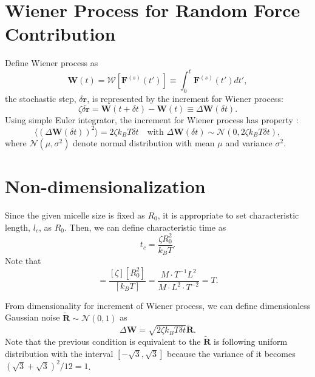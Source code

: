 \documentclass[10pt, a4paper]{report}
\begin{document}
\section{Wiener Process for Random Force Contribution}

Define Wiener process as
\begin{equation}
\mathbf{W}(t) = \mathscr{W}\left[\mathbf{F}^{(s)}(t')\right] \equiv \int_0^{t} \mathbf{F}^{(s)}(t')dt',
\end{equation}
the stochastic step, $\delta \mathbf{r}$, is represented by the increment for Wiener process:
\begin{equation}
\zeta \delta \mathbf{r} = \mathbf{W}(t+\delta t) - \mathbf{W}(t) \equiv \Delta \mathbf{W}(\delta t).
\end{equation}
Using simple Euler integrator, the increment for Wiener process has property \parencite{GREINER:1988cq}:
\begin{equation}
\langle (\Delta\mathbf{W}(\delta t))^2 \rangle = 2\zeta k_BT \delta t\quad\textrm{with }\Delta \mathbf{W}(\delta t) \sim \mathscr{N}(0, 2\zeta k_BT\delta t),\label{eq:increment_Wiener_process}
\end{equation}
where $\mathscr{N}(\mu, \sigma^2)$ denote normal distribution with mean $\mu$ and variance $\sigma^2$.


\section{Non-dimensionalization}
Since the given micelle size is fixed as $R_0$, it is appropriate to set characteristic length, $l_c$, as $R_0$. Then, we can define characteristic time as
\begin{equation}
t_c = \frac{\zeta R_0^2}{k_BT}.\label{eq:characteristic_time}
\end{equation}
Note that
\begin{equation}
[t_c] = \frac{[\zeta][R_0^2]}{[k_BT]} = \frac{M\cdot T^{-1} L^2}{M\cdot L^2\cdot T^{-2}} = T.
\end{equation}

From dimensionality for increment of Wiener process, we can define dimensionless Gaussian noise $\tilde{\mathbf{R}}\sim\mathscr{N}(0,1)$  as
\begin{equation}
\Delta \mathbf{W} = \sqrt{2\zeta k_BT\delta t}\tilde{\mathbf{R}}.
\end{equation}
Note that the previous condition is equivalent to the $\tilde{\mathbf{R}}$ is following uniform distribution with the interval $[-\sqrt{3}, \sqrt{3}]$ because the variance of it becomes $(\sqrt{3}+\sqrt{3})^2/12 = 1$. 
\end{document}

